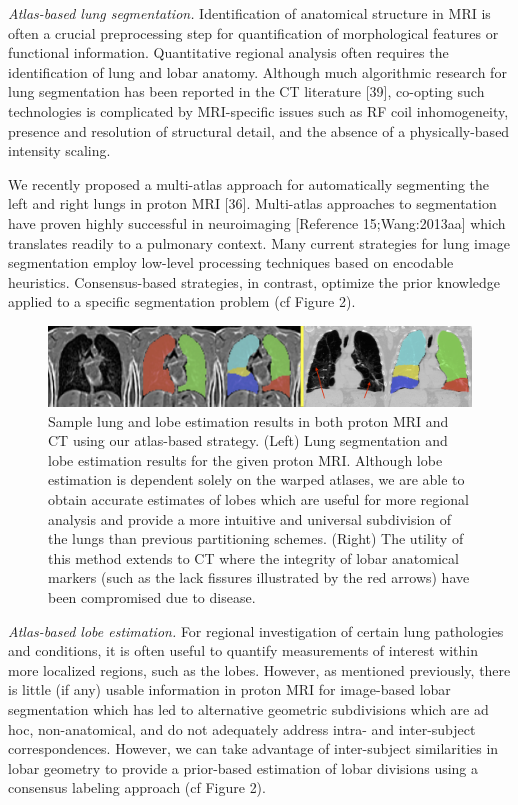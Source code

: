 \documentclass[11pt,]{article}
\begin{document}
\emph{Atlas-based lung segmentation.} Identification of anatomical
structure in MRI is often a crucial preprocessing step for
quantification of morphological features or functional information.
Quantitative regional analysis often requires the identification of lung
and lobar anatomy. Although much algorithmic research for lung
segmentation has been reported in the CT literature {[}39{]}, co-opting
such technologies is complicated by MRI-specific issues such as RF coil
inhomogeneity, presence and resolution of structural detail, and the
absence of a physically-based intensity scaling.

We recently proposed a multi-atlas approach for automatically segmenting
the left and right lungs in proton MRI {[}36{]}. Multi-atlas approaches
to segmentation have proven highly successful in neuroimaging
{[}Reference 15;Wang:2013aa{]} which translates readily to a pulmonary
context. Many current strategies for lung image segmentation employ
low-level processing techniques based on encodable heuristics.
Consensus-based strategies, in contrast, optimize the prior knowledge
applied to a specific segmentation problem (cf Figure 2).

\begin{figure}[htbp]
\centering
\includegraphics{Figs/lungEstimation.png}
\caption{Sample lung and lobe estimation results in both proton MRI and
CT using our atlas-based strategy. (Left) Lung segmentation and lobe
estimation results for the given proton MRI. Although lobe estimation is
dependent solely on the warped atlases, we are able to obtain accurate
estimates of lobes which are useful for more regional analysis and
provide a more intuitive and universal subdivision of the lungs than
previous partitioning schemes. (Right) The utility of this method
extends to CT where the integrity of lobar anatomical markers (such as
the lack fissures illustrated by the red arrows) have been compromised
due to disease.}
\end{figure}

\emph{Atlas-based lobe estimation.} For regional investigation of
certain lung pathologies and conditions, it is often useful to quantify
measurements of interest within more localized regions, such as the
lobes. However, as mentioned previously, there is little (if any) usable
information in proton MRI for image-based lobar segmentation which has
led to alternative geometric subdivisions which are ad hoc,
non-anatomical, and do not adequately address intra- and inter-subject
correspondences. However, we can take advantage of inter-subject
similarities in lobar geometry to provide a prior-based estimation of
lobar divisions using a consensus labeling approach (cf Figure 2).
\end{document}
